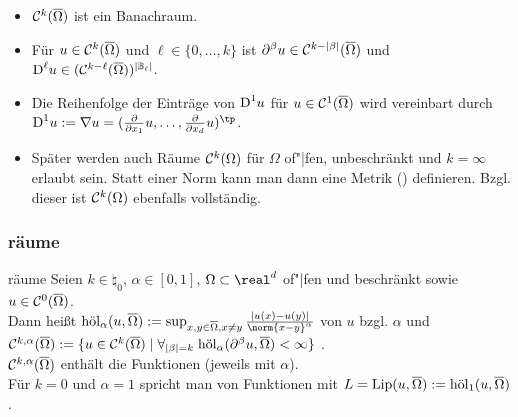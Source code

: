 \begin{Bem}
    \begin{itemize}
        \item
        $\C^k(\overline{\Omega})$ ist ein Banachraum.
        
        \item
        Für $u \in \C^k(\overline{\Omega})$ und $\ell \in \{0, \dotsc, k\}$ ist
        $\partial^\beta u \in \C^{k - |\beta|}(\overline{\Omega})$ und
        $\D^\ell u \in (\C^{k - \ell}(\overline{\Omega}))^{|\BB_\ell|}$.
        
        \item
        Die Reihenfolge der Einträge von $\D^1 u$ für $u \in \C^1(\overline{\Omega})$ wird
        vereinbart durch\\
        $\D^1 u := \nabla u =
        (\frac{\partial}{\partial x_1} u, \dotsc, \frac{\partial}{\partial x_d} u)^\tp$.
        
        \item
        Später werden auch Räume $\C^k(\Omega)$ für $\Omega$ of"|fen, unbeschränkt und
        $k = \infty$ erlaubt sein.
        Statt einer Norm kann man dann eine Metrik () definieren.
        Bzgl. dieser ist $\C^k(\Omega)$ ebenfalls vollständig.
    \end{itemize}
\end{Bem}

\subsubsection{%
    räume%
}

\begin{Def}{räume}
    Seien $k \in \natural_0$, $\alpha \in [0, 1]$, $\Omega \subset \real^d$ of"|fen
    und beschränkt sowie $u \in \C^0(\overline{\Omega})$.\\
    Dann heißt $\hol_\alpha(u, \overline{\Omega}) := \sup_{x, y \in \overline{\Omega}, x \not= y}
    \frac{|u(x) - u(y)|}{\norm{x - y}^\alpha}$  von $u$
    bzgl. $\alpha$ und\\
    $\C^{k,\alpha}(\overline{\Omega}) := \{u \in \C^k(\overline{\Omega}) \;|\;
    \forall_{|\beta| = k}\; \hol_\alpha(\partial^\beta u, \overline{\Omega}) < \infty\}$
    .\\
    $\C^{k,\alpha}(\overline{\Omega})$ enthält die  Funktionen
    (jeweils mit  $\alpha$).\\
    Für $k = 0$ und $\alpha = 1$ spricht man von  Funktionen
    mit 
    $L = \Lip(u, \overline{\Omega}) := \hol_1(u, \overline{\Omega})$.
\end{Def}

